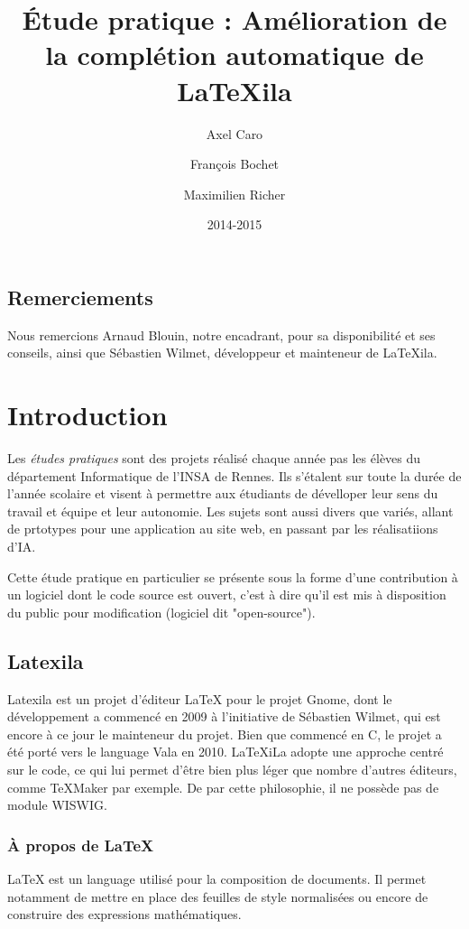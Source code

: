\documentclass[a4paper,11pt]{report}
\title{Étude pratique : Amélioration de la complétion automatique de \LaTeX{}ila}
\author{Axel Caro\and François Bochet\and Maximilien Richer}
\date{2014-2015}
\begin{document}
\maketitle %
\tableofcontents %

\section{Remerciements} %
\label{sec:remerciements}
Nous remercions Arnaud Blouin, notre encadrant, pour sa disponibilité et ses conseils, ainsi que Sébastien Wilmet, développeur et mainteneur de LaTeXila.

\chapter{Introduction}
\label{cha:Introduction}
Les \textit{études pratiques} sont des projets réalisé chaque année pas les élèves du département Informatique de l'INSA de Rennes. Ils s'étalent sur toute la durée de l'année scolaire et visent à permettre aux étudiants de dévelloper leur sens du travail et équipe et leur autonomie. Les sujets sont aussi divers que variés, allant de prtotypes pour une application au site web, en passant par les réalisatiions d'IA.

Cette étude pratique en particulier se présente sous la forme d'une contribution à un logiciel dont le code source est ouvert, c'est à dire qu'il est mis à disposition du public pour modification (logiciel dit "open-source").

\section{Latexila}
\label{sec:latexila}
Latexila est un projet d'éditeur LaTeX pour le projet Gnome, dont le développement a commencé en 2009 à l'initiative de Sébastien Wilmet, qui est encore à ce jour le mainteneur du projet. Bien que commencé en C, le projet a été porté vers le language Vala en 2010. LaTeXiLa adopte une approche centré sur le code, ce qui lui permet d'être bien plus léger que nombre d'autres éditeurs, comme TeXMaker par exemple. De par cette philosophie, il ne possède pas de module WISWIG.

\subsection{À propos de \LaTeX{}}
LaTeX est un language utilisé pour la composition de documents. Il permet notamment de mettre en place des feuilles de style normalisées ou encore de construire des expressions mathématiques.
\end{document}
